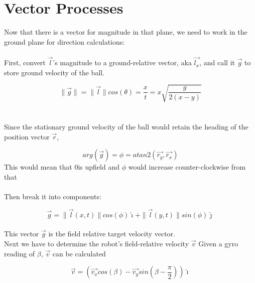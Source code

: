 \documentclass{article}
\begin{document}
\newpage

\section{Vector Processes}

Now that there is a vector for magnitude in that plane, we need to work in the ground plane for direction calculations:
\\
\\
First, convert $\vec{l}$'s magnitude to a ground-relative vector, aka $\vec{l_x}$, and call it $\vec{g}$ to store ground velocity of the ball.

\[\|\vec{g}\| = \|\vec{l}\|cos(\theta) = \frac{x}{t} = x\sqrt{\frac{g}{2(x-y)}}\]
\\\\
Since the stationary ground velocity of the ball would retain the heading of the position vector $\vec{r}$,

\[arg(\vec{g}) = \phi = atan2(\vec{r_y},\vec{r_x})\]
This would mean that 0\textdegree is upfield and $\phi$ would increase counter-clockwise from that
\\\\
Then break it into components:

\[\vec{g} = \|\vec{l}(x,t)\|cos(\phi)\hat{\imath} + \|\vec{l}(y,t)\|sin(\phi)\hat{\jmath}\]
\\
This vector $\vec{g}$ is the field relative target velocity vector. 
\\
Next we have to determine the robot's field-relative velocity $\vec{v}$
Given a gyro reading of $\beta$, $\vec{v}$ can be calculated

\[\vec{v} = (\vec{v_x}cos(\beta) - \vec{v_y}sin(\beta-\frac{\pi}{2}))\hat{\imath}\]
\end{document}
